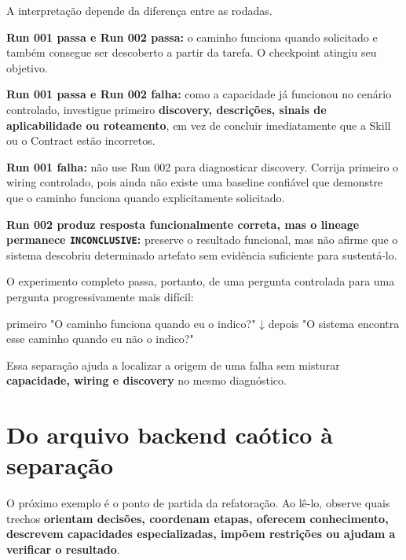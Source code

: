 \documentclass[
  10pt,
  a4paper,
  oneside]{book}
\newenvironment{Shaded}{}{}
\newcommand{\NormalTok}[1]{#1}
\renewenvironment{Shaded}{\begin{snugshade}}{\end{snugshade}}%
\begin{document}
A interpretação depende da diferença entre as rodadas.

\textbf{Run 001 passa e Run 002 passa:} o caminho funciona quando
solicitado e também consegue ser descoberto a partir da tarefa. O
checkpoint atingiu seu objetivo.

\textbf{Run 001 passa e Run 002 falha:} como a capacidade já funcionou
no cenário controlado, investigue primeiro \textbf{discovery,
descrições, sinais de aplicabilidade ou roteamento}, em vez de concluir
imediatamente que a Skill ou o Contract estão incorretos.

\textbf{Run 001 falha:} não use Run 002 para diagnosticar discovery.
Corrija primeiro o wiring controlado, pois ainda não existe uma baseline
confiável que demonstre que o caminho funciona quando explicitamente
solicitado.

\textbf{Run 002 produz resposta funcionalmente correta, mas o lineage
permanece \texttt{INCONCLUSIVE}:} preserve o resultado funcional, mas
não afirme que o sistema descobriu determinado artefato sem evidência
suficiente para sustentá-lo.

O experimento completo passa, portanto, de uma pergunta controlada para
uma pergunta progressivamente mais difícil:

\begin{Shaded}
\begin{Highlighting}[]
\NormalTok{primeiro}
\NormalTok{"O caminho funciona quando eu o indico?"}
\NormalTok{                ↓}
\NormalTok{depois}
\NormalTok{"O sistema encontra esse caminho quando eu não o indico?"}
\end{Highlighting}
\end{Shaded}

Essa separação ajuda a localizar a origem de uma falha sem misturar
\textbf{capacidade, wiring e discovery} no mesmo diagnóstico.

\hypertarget{do-arquivo-backend-cauxf3tico-uxe0-separauxe7uxe3o}{%
\section{Do arquivo backend caótico à
separação}\label{do-arquivo-backend-cauxf3tico-uxe0-separauxe7uxe3o}}

O próximo exemplo é o ponto de partida da refatoração. Ao lê-lo, observe
quais trechos \textbf{orientam decisões, coordenam etapas, oferecem
conhecimento, descrevem capacidades especializadas, impõem restrições ou
ajudam a verificar o resultado}.
\end{document}
